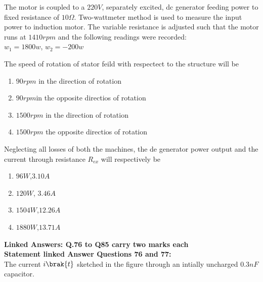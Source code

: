 The motor is coupled to a $220 V$, separately excited, dc generator feeding power to fixed resistance of $10\Omega$. Two-wattmeter method is used to measure the input power to induction motor. The variable resistance is adjusted such that the motor runs at $1410 rpm$ and the following readings were recorded:\\
$w_1=1800w$, $w_2=-200w$\\
\item The speed of rotation of stator feild with respectect to the structure will be 
\begin{enumerate}
    \item $90 rpm$ in the direction of rotation 
    \item $90 rpm$in the opposite directios of rotation 
    \item $1500 rpm$ in the direction of rotation 
    \item $1500 rpm$ the opposite directios of rotation 
\end{enumerate}
\item Neglecting all losses of both the machines, the de generator power output and the current through resistance $R_{ex}$ will respectively be
\begin{enumerate}
    \item $96 W$,$3.10 A$
    \item $120 W$, $3.46 A$
    \item $1504W$,$12.26 A$
    \item $1880W$,$13.71 A$
\end{enumerate}
\textbf{Linked Answers: Q.76 to Q85 carry two marks each}\\
\textbf{Statement linked Answer Questions 76 and 77:}\\
The current $i\brak{t}$ sketched in the figure through an intially uncharged $0.3 nF$ capacitor.
